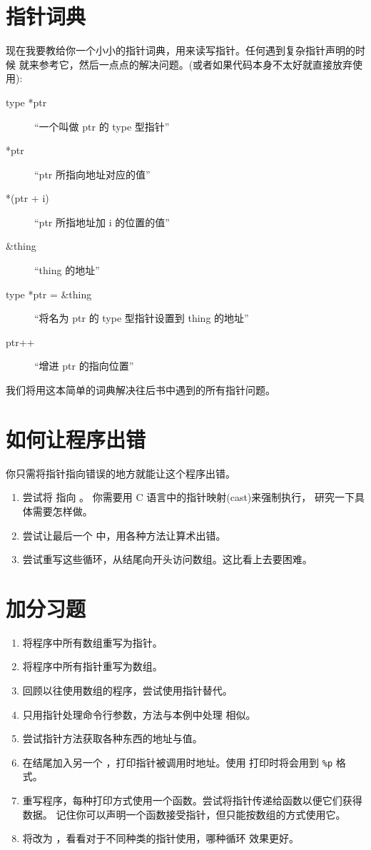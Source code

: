 \section{指针词典}

现在我要教给你一个小小的指针词典，用来读写指针。任何遇到复杂指针声明的时候
就来参考它，然后一点点的解决问题。(或者如果代码本身不太好就直接放弃使用):

\begin{description}
\item[type *ptr] “一个叫做 ptr 的 type 型指针”
\item[*ptr] “ptr 所指向地址对应的值”
\item[*(ptr + i)] “ptr 所指地址加 i 的位置的值”
\item[\&thing] “thing 的地址”
\item[type *ptr = \&thing] “将名为 ptr 的 type 型指针设置到 thing 的地址”
\item[ptr++] “增进 ptr 的指向位置”
\end{description}

我们将用这本简单的词典解决往后书中遇到的所有指针问题。

\section{如何让程序出错}

你只需将指针指向错误的地方就能让这个程序出错。

\begin{enumerate}
\item 尝试将  指向 。 你需要用 C 语言中的指针映射(cast)来强制执行，
	研究一下具体需要怎样做。
\item 尝试让最后一个 中，用各种方法让算术出错。
\item 尝试重写这些循环，从结尾向开头访问数组。这比看上去要困难。
\end{enumerate}

\section{加分习题}

\begin{enumerate}
\item 将程序中所有数组重写为指针。
\item 将程序中所有指针重写为数组。
\item 回顾以往使用数组的程序，尝试使用指针替代。
\item 只用指针处理命令行参数，方法与本例中处理  相似。
\item 尝试指针方法获取各种东西的地址与值。
\item 在结尾加入另一个 ，打印指针被调用时地址。使用 
	打印时将会用到 \verb|%p| 格式。
\item 重写程序，每种打印方式使用一个函数。尝试将指针传递给函数以便它们获得数据。
	记住你可以声明一个函数接受指针，但只能按数组的方式使用它。
\item 将改为 ，看看对于不同种类的指针使用，哪种循环
	效果更好。
\end{enumerate}


